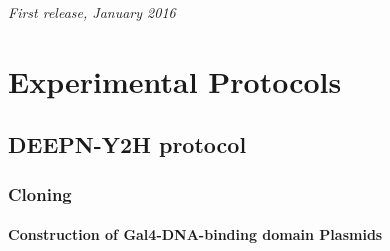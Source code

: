 \documentclass[11pt,fleqn]{book} %
\begin{document}
\noindent \textit{First release, January 2016} %



\pagestyle{empty} %

\tableofcontents %

\cleardoublepage %

\pagestyle{fancy} %


\part{Experimental Protocols}



\chapter{DEEPN-Y2H protocol}

\section{Cloning}

\subsection{Construction of Gal4-DNA-binding domain Plasmids}
\end{document}
